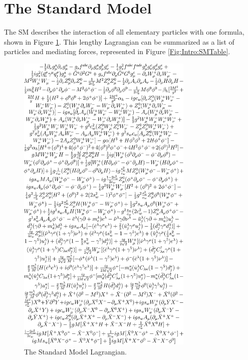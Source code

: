 \section{The Standard Model}
The SM describes the interaction of all elementary particles with one formula, shown in Figure \ref{Fig:Intro:SML}. This lengthy Lagrangian can be summarized as a list of particles and mediating forces, represented in Figure \ref{Fig:Intro:SMTable}.
\begin{figure}[ht]
    \centering
        \includegraphics[width=0.75\textwidth]{F1/StandardModelEquation}
        \caption{The Standard Model Lagrangian.}
        \label{Fig:Intro:SML}
\end{figure}
